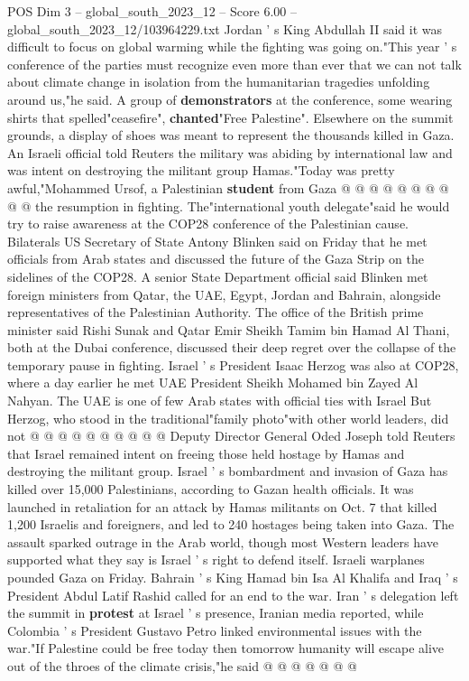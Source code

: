 \begin{textsample}{POS Dim 3 – global\_south\_2023\_12 – Score 6.00 – global\_south\_2023\_12/103964229.txt}
Jordan ' s King Abdullah II said it was difficult to focus on global warming while the fighting was going on."This year ' s conference of the parties must recognize even more than ever that we can not talk about climate change in isolation from the humanitarian tragedies unfolding around us,"he said.
A group of \textbf{demonstrators} at the conference, some wearing shirts that spelled"ceasefire", \textbf{chanted}"Free Palestine".
Elsewhere on the summit grounds, a display of shoes was meant to represent the thousands killed in Gaza.
An Israeli official told Reuters the military was abiding by international law and was intent on destroying the militant group Hamas."Today was pretty awful,"Mohammed Ursof, a Palestinian \textbf{student} from Gaza @ @ @ @ @ @ @ @ @ @ the resumption in fighting.
The"international youth delegate"said he would try to raise awareness at the COP28 conference of the Palestinian cause.
Bilaterals US Secretary of State Antony Blinken said on Friday that he met officials from Arab states and discussed the future of the Gaza Strip on the sidelines of the COP28.
A senior State Department official said Blinken met foreign ministers from Qatar, the UAE, Egypt, Jordan and Bahrain, alongside representatives of the Palestinian Authority.
The office of the British prime minister said Rishi Sunak and Qatar Emir Sheikh Tamim bin Hamad Al Thani, both at the Dubai conference, discussed their deep regret over the collapse of the temporary pause in fighting.
Israel ' s President Isaac Herzog was also at COP28, where a day earlier he met UAE President Sheikh Mohamed bin Zayed Al Nahyan.
The UAE is one of few Arab states with official ties with Israel But Herzog, who stood in the traditional"family photo"with other world leaders, did not @ @ @ @ @ @ @ @ @ @ Deputy Director General Oded Joseph told Reuters that Israel remained intent on freeing those held hostage by Hamas and destroying the militant group.
Israel ' s bombardment and invasion of Gaza has killed over 15,000 Palestinians, according to Gazan health officials.
It was launched in retaliation for an attack by Hamas militants on Oct. 7 that killed 1,200 Israelis and foreigners, and led to 240 hostages being taken into Gaza.
The assault sparked outrage in the Arab world, though most Western leaders have supported what they say is Israel ' s right to defend itself.
Israeli warplanes pounded Gaza on Friday.
Bahrain ' s King Hamad bin Isa Al Khalifa and Iraq ' s President Abdul Latif Rashid called for an end to the war.
Iran ' s delegation left the summit in \textbf{protest} at Israel ' s presence, Iranian media reported, while Colombia ' s President Gustavo Petro linked environmental issues with the war."If Palestine could be free today then tomorrow humanity will escape alive out of the throes of the climate crisis,"he said @ @ @ @ @ @ @

\end{textsample}
